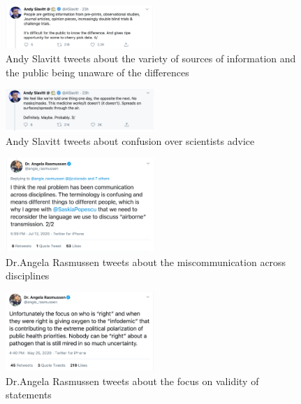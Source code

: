 \documentclass[acmsmall,authordraft]{acmart}
\begin{document}
\begin{figure}
  \includegraphics[width=0.5\textwidth]{Pictures/Appendix_Tweets/andy slavitt tweet.png}
  \caption{Andy Slavitt tweets about the variety of sources of information and the public being unaware of the differences}
  \label{andy_slavitt_tweet}
\end{figure}

\begin{figure}
  \includegraphics[width=0.5\textwidth]{Pictures/Appendix_Tweets/andy slavitt tweet2.png}
  \caption{Andy Slavitt tweets about confusion over scientists advice}
  \label{andy_slavitt_tweet2}
\end{figure}

\begin{figure}
  \includegraphics[width=0.5\textwidth]{Pictures/Appendix_Tweets/angela rasmussen tweet.png}
  \caption{Dr.Angela Rasmussen tweets about the miscommunication across disciplines}
  \label{angela_rasmussen_tweet}
\end{figure}

\begin{figure}
  \includegraphics[width=0.5\textwidth]{Pictures/Appendix_Tweets/angela rasmussen tweet2.png}
  \caption{Dr.Angela Rasmussen tweets about the focus on validity of statements}
  \label{angela_rasmussen_tweet2}
\end{figure}
\end{document}
